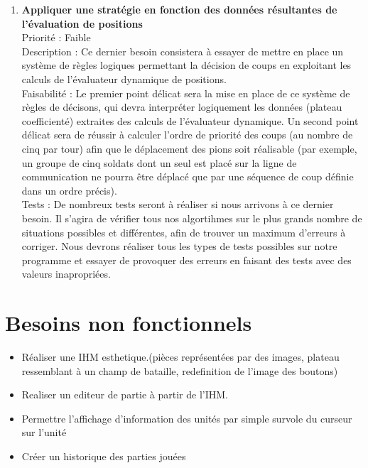 \documentclass[12pt]{article}
\begin{document}
			\begin{enumerate}

				\item \textbf{Appliquer une stratégie en fonction des données résultantes de l'évaluation de positions} \\[0.7\baselineskip]
				Priorité : Faible \\[0.7\baselineskip]
				Description : Ce dernier besoin consistera à essayer de mettre en place un système de règles logiques permettant la décision de coups en exploitant les calculs de l'évaluateur dynamique de positions. \\[0.7\baselineskip]
				Faisabilité : Le premier point délicat sera la mise en place de ce système de règles de décisons, qui devra interpréter logiquement les données (plateau coefficienté) extraites des calculs de l'évaluateur dynamique. Un second point délicat sera de réussir à calculer l'ordre de priorité des coups (au nombre de cinq par tour) afin que le déplacement des pions soit réalisable (par exemple, un groupe de cinq soldats dont un seul est placé sur la ligne de communication ne pourra être déplacé que par une séquence de coup définie dans un ordre précis). \\[0.7\baselineskip]
				Tests : De nombreux tests seront à réaliser si nous arrivons à ce dernier besoin. Il s'agira de vérifier tous nos algortihmes sur le plus grands nombre de situations possibles et différentes, afin de trouver un maximum d'erreurs à corriger. Nous devrons réaliser tous les types de tests possibles sur notre programme et essayer de provoquer des erreurs en faisant des tests avec des valeurs inapropriées. \\[0.7\baselineskip]
				
			\end{enumerate}

	\section{Besoins non fonctionnels} 

		\begin{itemize}
                        \item Réaliser une IHM esthetique.(pièces représentées par des images, plateau ressemblant à un champ de bataille, redefinition de l'image des boutons)
                        \item Realiser un editeur de partie à partir de l'IHM.
                        \item Permettre l'affichage d'information des unités par simple survole du curseur sur l'unité
			\item Créer un historique des parties jouées
		\end{itemize}
\end{document}
